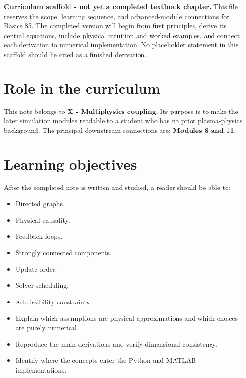 \documentclass[11pt]{article}
\begin{document}

\begin{overviewbox}
\textbf{Curriculum scaffold - not yet a completed textbook chapter.} This file reserves the scope, learning sequence, and advanced-module connections for Basics 85. The completed version will begin from first principles, derive its central equations, include physical intuition and worked examples, and connect each derivation to numerical implementation. No placeholder statement in this scaffold should be cited as a finished derivation.
\end{overviewbox}

\ProjectTOC

\section{Role in the curriculum}
This note belongs to \textbf{X - Multiphysics coupling}. Its purpose is to make the later simulation modules readable to a student who has no prior plasma-physics background. The principal downstream connections are: \textbf{Modules 8 and 11}.

\section{Learning objectives}
After the completed note is written and studied, a reader should be able to:
\begin{itemize}[leftmargin=1.6em]
\item Directed graphs.
\item Physical causality.
\item Feedback loops.
\item Strongly connected components.
\item Update order.
\item Solver scheduling.
\item Admissibility constraints.
\item Explain which assumptions are physical approximations and which choices are purely numerical.
\item Reproduce the main derivations and verify dimensional consistency.
\item Identify where the concepts enter the Python and MATLAB implementations.
\end{itemize}
\end{document}
